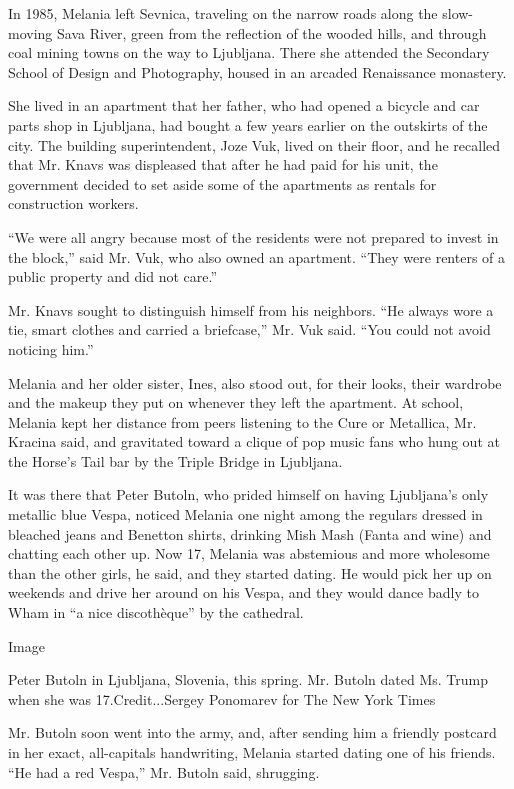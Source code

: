 In 1985, Melania left Sevnica, traveling on the narrow roads along the
slow-moving Sava River, green from the reflection of the wooded hills,
and through coal mining towns on the way to Ljubljana. There she
attended the Secondary School of Design and Photography, housed in an
arcaded Renaissance monastery.

She lived in an apartment that her father, who had opened a bicycle and
car parts shop in Ljubljana, had bought a few years earlier on the
outskirts of the city. The building superintendent, Joze Vuk, lived on
their floor, and he recalled that Mr. Knavs was displeased that after he
had paid for his unit, the government decided to set aside some of the
apartments as rentals for construction workers.

``We were all angry because most of the residents were not prepared to
invest in the block,'' said Mr. Vuk, who also owned an apartment. ``They
were renters of a public property and did not care.''

Mr. Knavs sought to distinguish himself from his neighbors. ``He always
wore a tie, smart clothes and carried a briefcase,'' Mr. Vuk said. ``You
could not avoid noticing him.''

Melania and her older sister, Ines, also stood out, for their looks,
their wardrobe and the makeup they put on whenever they left the
apartment. At school, Melania kept her distance from peers listening to
the Cure or Metallica, Mr. Kracina said, and gravitated toward a clique
of pop music fans who hung out at the Horse's Tail bar by the Triple
Bridge in Ljubljana.

It was there that Peter Butoln, who prided himself on having Ljubljana's
only metallic blue Vespa, noticed Melania one night among the regulars
dressed in bleached jeans and Benetton shirts, drinking Mish Mash (Fanta
and wine) and chatting each other up. Now 17, Melania was abstemious and
more wholesome than the other girls, he said, and they started dating.
He would pick her up on weekends and drive her around on his Vespa, and
they would dance badly to Wham in ``a nice discothèque'' by the
cathedral.

Image

Peter Butoln in Ljubljana, Slovenia, this spring. Mr. Butoln dated Ms.
Trump when she was 17.Credit...Sergey Ponomarev for The New York Times

Mr. Butoln soon went into the army, and, after sending him a friendly
postcard in her exact, all-capitals handwriting, Melania started dating
one of his friends. ``He had a red Vespa,'' Mr. Butoln said, shrugging.

